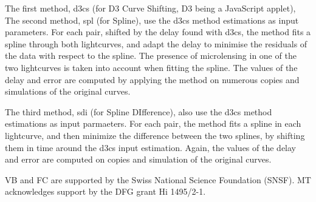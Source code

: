 \documentclass[traditabstract]{aa}
\begin{document}
The first method, d3cs (for D3 Curve Shifting, D3 being a JavaScript applet), 
The second method, spl (for Spline), use the d3cs method estimations as input parameters. For each pair, shifted by the delay found with d3cs, the method fits a spline through both lightcurves, and adapt the delay to minimise the residuals of the data with respect to the spline. The presence of microlensing in one of the two lightcurves is taken into account when fitting the spline. The values of the delay and error are computed by applying the method on numerous copies and simulations of the original curves.

The third method, sdi (for Spline DIfference), also use the d3cs method estimations as input parmaeters. For each pair, the method fits a spline in each lightcurve, and then minimize the difference between the two splines, by shifting them in time around the d3cs input estimation. Again, the values of the delay and error are computed on copies and simulation of the original curves.

\citep{pycs}


\begin{acknowledgements}
VB and FC are supported by the Swiss National Science Foundation (SNSF). MT acknowledges support by the DFG grant Hi 1495/2-1.
\end{acknowledgements}





\end{document}
